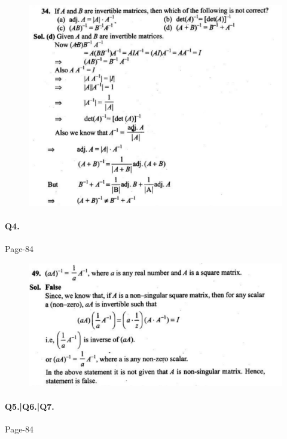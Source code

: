 \documentclass{article}
\begin{document}
\begin{figure}[H]
    \includegraphics[scale=0.5]{determinants_l3_ps_9.png}
\end{figure}


\paragraph{Q4.}
\begin{flushright}
Page-84
\end{flushright}

\begin{figure}[H]
    \includegraphics[scale=0.5]{determinants_l3_ps_5.png}
\end{figure}

\paragraph{Q5.|Q6.|Q7.}
\begin{flushright}
Page-84
\end{flushright}
\end{document}
